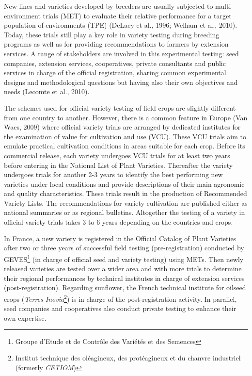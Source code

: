 \documentclass[a4paper]{article}
\let\rmarkdownfootnote\footnote%
\def\footnote{\protect\rmarkdownfootnote}
\begin{document}
New lines and varieties developed by breeders are usually subjected to
multi-environment trials (MET) to evaluate their relative performance
for a target population of environments (TPE) (DeLacy et al., 1996;
Welham et al., 2010). Today, these trials still play a key role in
variety testing during breeding programs as well as for providing
recommendations to farmers by extension services. A range of
stakeholders are involved in this experimental testing: seed companies,
extension services, cooperatives, private consultants and public
services in charge of the official registration, sharing common
experimental designs and methodological questions but having also their
own objectives and needs (Lecomte et al., 2010).

The schemes used for official variety testing of field crops are
slightly different from one country to another. However, there is a
common feature in Europe (Van Waes, 2009) where official variety trials
are arranged by dedicated institutes for the examination of value for
cultivation and use (VCU). These VCU trials aim to emulate practical
cultivation conditions in areas suitable for each crop. Before its
commercial release, each variety undergoes VCU trials for at least two
years before entering in the National List of Plant Varieties.
Thereafter the variety undergoes trials for another 2-3 years to
identify the best performing new varieties under local conditions and
provide descriptions of their main agronomic and quality
characteristics. These trials result in the production of Recommended
Variety Lists. The recommendations for variety cultivation are published
either as national summaries or as regional bulletins. Altogether the
testing of a variety in official variety trials takes 3 to 6 years
depending on the countries and crops.

In France, a new variety is registered in the Official Catalog of Plant
Varieties after two or three years of successful field testing
(pre-registration) conducted by GEVES\footnote{Groupe d'Etude et de
  Contrôle des Variétés et des Semences} (in charge of official seed and
variety testing) using METs. Then newly released varieties are tested
over a wider area and with more trials to determine their regional
performances by technical institutes in charge of extension services
(post-registration). Regarding sunflower, the French technical institute
for oilseed crops (\emph{Terres Inovia}\footnote{Institut technique des
  oléagineux, des protéagineux et du chanvre industriel (formerly
  \emph{CETIOM})}) is in charge of the post-registration activity. In
parallel, seed companies and cooperatives also conduct private testing
to enhance their own expertise.
\end{document}
